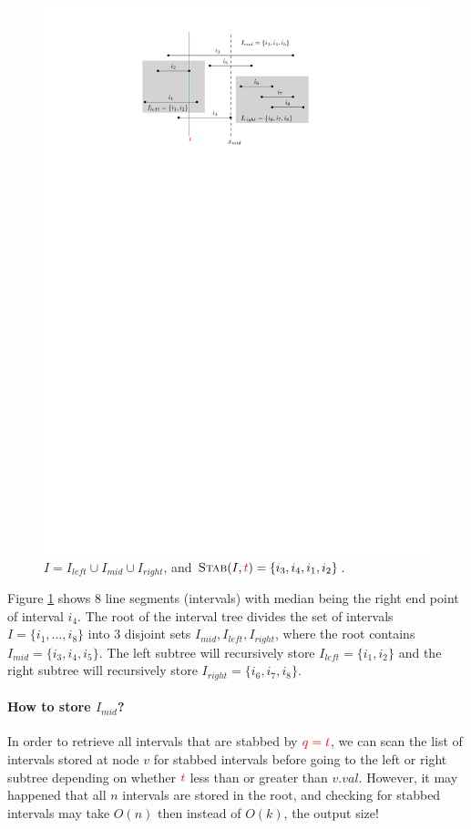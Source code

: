 \begin{figure}[ht!]
\centering
\includegraphics[scale=.8]{ipe/stabbing-line.pdf}
\caption{ $I = I_{left} \cup I_{mid} \cup I_{right} $, and $\textsc{Stab}(I, \textcolor{red}{t}) = \{ i_3, i_4, i_1, i_2 \}$.}
\label{fig:stabbing-line}
\end{figure}

Figure \ref{fig:stabbing-line} shows 8 line segments (intervals) with median being the right end point of interval $i_4$.
%
The root of the interval tree divides the set of intervals $I = \{i_1, \dots, i_8\}$ into 3 disjoint sets $I_{mid}, I_{left}, I_{right}$, where the root contains $I_{mid} = \{ i_3, i_4, i_5 \}$.
%
The left subtree will recursively store $I_{left} = \{ i_1, i_2 \}$ and the right subtree will recursively store $I_{right} =\{i_6, i_7, i_8 \}$.
% 
\paragraph{How to store $I_{mid}$?} 
In order to retrieve all intervals that are stabbed by $\textcolor{red}{q = t}$, we can scan the list of intervals stored at node $v$ for stabbed intervals before going to the left or right subtree depending on whether $\textcolor{red}{t}$ less than or greater than $v.val$.
%
However, it may happened that all $n$ intervals are stored in the root, and checking for stabbed intervals may take $O(n)$ then instead of $O(k)$, the output size!

